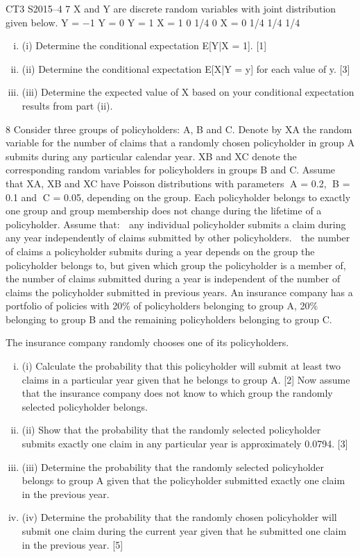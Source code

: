\documentclass[a4paper,12pt]{article}
\begin{document}
\begin{enumerate}
CT3 S2015–4
7 X and Y are discrete random variables with joint distribution given below.
Y = −1 Y = 0 Y = 1
X = 1 0 1/4 0
X = 0 1/4 1/4 1/4
\begin{enumerate}[(i)]
\item (i) Determine the conditional expectation E[Y|X = 1]. [1]
\item (ii) Determine the conditional expectation E[X|Y = y] for each value of y. [3]
\item(iii) Determine the expected value of X based on your conditional expectation results from part (ii).
\end{enumerate}
8 Consider three groups of policyholders: A, B and C. Denote by XA the random variable for the number of claims that a randomly chosen policyholder in group A submits during any particular calendar year. XB and XC denote the corresponding random variables for policyholders in groups B and C.
Assume that XA, XB and XC have Poisson distributions with parameters A = 0.2,
B = 0.1 and C = 0.05, depending on the group.
Each policyholder belongs to exactly one group and group membership does not change during the lifetime of a policyholder.
Assume that:
   any individual policyholder submits a claim during any year independently of claims submitted by other policyholders.
 the number of claims a policyholder submits during a year depends on the group the policyholder belongs to, but given which group the policyholder is a member of, the number of claims submitted during a year is independent of the number of claims the policyholder submitted in previous years.
An insurance company has a portfolio of policies with 20\% of policyholders belonging to group A, 20\% belonging to group B and the remaining policyholders belonging to group C.

The insurance company randomly chooses one of its policyholders.
\begin{enumerate}[(i)]
\item (i) Calculate the probability that this policyholder will submit at least two claims in a particular year given that he belongs to group A. [2]
Now assume that the insurance company does not know to which group the randomly selected policyholder belongs.
\item (ii) Show that the probability that the randomly selected policyholder submits exactly one claim in any particular year is approximately 0.0794. [3]
\item (iii) Determine the probability that the randomly selected policyholder belongs to
group A given that the policyholder submitted exactly one claim in the
previous year. 
\item (iv) Determine the probability that the randomly chosen policyholder will submit
one claim during the current year given that he submitted one claim in the
previous year. [5]
\end{enumerate}


\end{enumerate}
\end{document}
